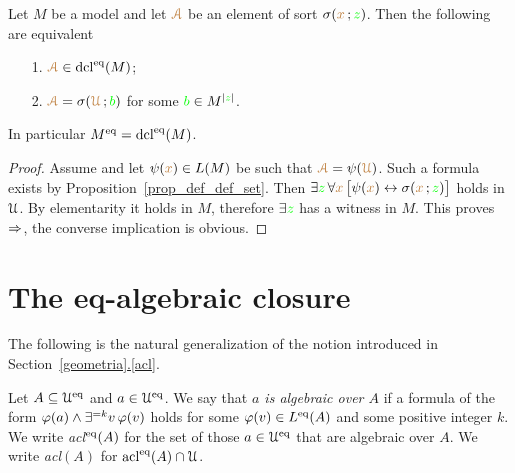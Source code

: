 \documentclass[creche.tex]{subfiles}
\begin{document}
\begin{proposition}\label{prop_standard_def_set}
Let $M$ be a model and let ${\color{brown}\EuScript A}$ be an element of sort $\sigma({\color{brown} x}\,;{\color{green} z})$.
Then the following are equivalent
\begin{itemize}
\item[1.]  ${\color{brown}\EuScript A}\in\mathop{\rm dcl}^{{\rm eq}}(M)$; 
\item[2.]  ${\color{brown}\EuScript A}=\sigma({\color{brown}\EuScript U}\,;{\color{green} b})$ for some ${\color{green} b}\in M^{|{\color{green} z}|}$.
\end{itemize}
In particular $M^{{\rm eq}}=\mathop{\rm dcl}^{{\rm eq}}(M)$.
\end{proposition}

\begin{proof}
Assume  and let $\psi({\color{brown} x})\in L(M)$ be such that ${\color{brown}\EuScript A}=\psi({\color{brown}\EuScript U})$.
Such a formula exists by Proposition~\ref{prop_def_def_set}.
Then $\exists{\color{green}z}\,\forall{\color{brown}x}\,\big[\psi({\color{brown} x})\leftrightarrow\sigma({\color{brown} x}\,;{\color{green} z})\big]$ holds in $\EuScript U$.
By elementarity it holds in $M$, therefore $\exists{\color{green}z}$ has a witness in $M$.
This proves $\Rightarrow$, the converse implication is obvious.
\end{proof}

\section{The eq-algebraic closure}

The following is the natural generalization of the notion introduced in Section~\hyperref[acl]{\ref*{geometria}.\ref*{acl}}.

\begin{definition}
  Let $A\subseteq\EuScript U^{{\rm eq}}$ and $a\in\EuScript U^{{\rm eq}}$.
  We say that \emph{$a$ is algebraic over $A$\/} if a formula of the form $\varphi(a)\wedge\exists^{=k}v\,\varphi(v)$ holds for some $\varphi(v)\in L^{{\rm eq}}(A)$ and some positive integer $k$.
  We write \emph{\rm acl$^{\rm eq}(A)$\/} for the set of those $a\in\EuScript U^{{\rm eq}}$ that are algebraic over $A$.
  We write \emph{\rm acl$(A)$\/} for $\mathop{\rm acl}^{{\rm eq}}(A)\cap\EuScript U$.
\end{definition}

\end{document}
